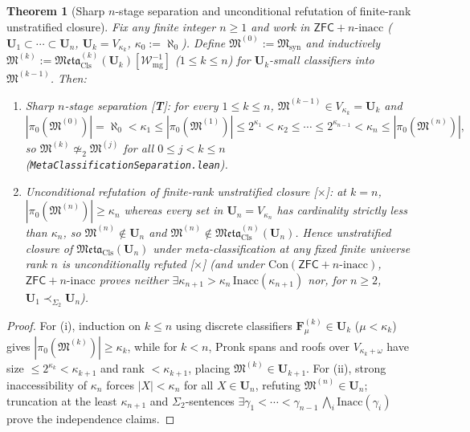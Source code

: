 \documentclass[11pt]{article}
\theoremstyle{plain}
\newtheorem{theorem}{Theorem}[section]
\theoremstyle{definition}
\newcommand{\fM}{\mathfrak{M}}
\newcommand{\Meta}{\mathfrak{Meta}}
\newcommand{\Con}{\mathrm{Con}}
\newcommand{\ZFC}{\mathsf{ZFC}}
\begin{document}
\begin{theorem}[Sharp $n$-stage separation and unconditional refutation of finite-rank unstratified closure]\label{thm:b2-finite-rank-nogo}
Fix any finite integer $n \ge 1$ and work in $\ZFC + n\text{-}\mathrm{inacc}$ ($\mathbf{U}_1 \subset \cdots \subset \mathbf{U}_n$, $\mathbf{U}_k = V_{\kappa_k}$, $\kappa_0 := \aleph_0$). Define $\fM^{(0)} := \fM_{\mathrm{syn}}$ and inductively $\fM^{(k)} := \Meta_{\mathrm{Cls}}^{(k)}(\mathbf{U}_k)[\mathcal{W}_{\mathrm{mg}}^{-1}]$ ($1 \le k \le n$) for $\mathbf{U}_k$-small classifiers into $\fM^{(k-1)}$. Then:
\begin{enumerate}[nosep,label=(\roman*)]
\item \emph{Sharp $n$-stage separation \textup{[\textbf{T}]}}: for every $1 \le k \le n$, $\fM^{(k-1)} \in V_{\kappa_k} = \mathbf{U}_k$ and
\[
  |\pi_0(\fM^{(0)})| = \aleph_0 < \kappa_1 \le |\pi_0(\fM^{(1)})| \le 2^{\kappa_1} < \kappa_2 \le \cdots \le 2^{\kappa_{n-1}} < \kappa_n \le |\pi_0(\fM^{(n)})|,
\]
so $\fM^{(k)} \not\simeq_2 \fM^{(j)}$ for all $0 \le j < k \le n$ (\texttt{MetaClassificationSeparation.lean}).
\item \emph{Unconditional refutation of finite-rank unstratified closure \textup{[\textbf{$\times$}]}}: at $k = n$, $|\pi_0(\fM^{(n)})| \ge \kappa_n$ whereas every set in $\mathbf{U}_n = V_{\kappa_n}$ has cardinality strictly less than $\kappa_n$, so $\fM^{(n)} \notin \mathbf{U}_n$ and $\fM^{(n)} \notin \Meta_{\mathrm{Cls}}^{(n)}(\mathbf{U}_n)$. Hence unstratified closure of $\Meta_{\mathrm{Cls}}(\mathbf{U}_n)$ under meta-classification at any fixed finite universe rank $n$ is unconditionally refuted \textup{[\textbf{$\times$}]} (and under $\Con(\ZFC + n\text{-}\mathrm{inacc})$, $\ZFC + n\text{-}\mathrm{inacc}$ proves neither $\exists\kappa_{n+1} > \kappa_n\,\mathrm{Inacc}(\kappa_{n+1})$ nor, for $n \ge 2$, $\mathbf{U}_1 \prec_{\Sigma_2} \mathbf{U}_n$).
\end{enumerate}
\end{theorem}
\begin{proof}
For (i), induction on $k \le n$ using discrete classifiers $\mathbf{F}_\mu^{(k)} \in \mathbf{U}_k$ ($\mu < \kappa_k$) gives $|\pi_0(\fM^{(k)})| \ge \kappa_k$, while for $k < n$, Pronk spans and roofs over $V_{\kappa_k + \omega}$ have size $\le 2^{\kappa_k} < \kappa_{k+1}$ and rank $< \kappa_{k+1}$, placing $\fM^{(k)} \in \mathbf{U}_{k+1}$. For (ii), strong inaccessibility of $\kappa_n$ forces $|X| < \kappa_n$ for all $X \in \mathbf{U}_n$, refuting $\fM^{(n)} \in \mathbf{U}_n$; truncation at the least $\kappa_{n+1}$ and $\Sigma_2$-sentences $\exists \gamma_1 < \cdots < \gamma_{n-1}\,\bigwedge_i \mathrm{Inacc}(\gamma_i)$ prove the independence claims.
\end{proof}
\end{document}
